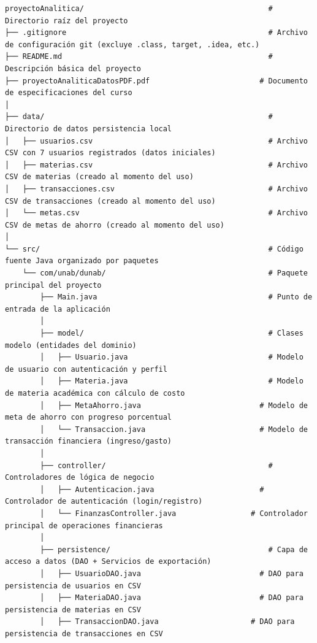 \documentclass[utf8]{article}
\begin{document}
\begin{verbatim}
proyectoAnalitica/                                          # Directorio raíz del proyecto
├── .gitignore                                              # Archivo de configuración git (excluye .class, target, .idea, etc.)
├── README.md                                               # Descripción básica del proyecto
├── proyectoAnaliticaDatosPDF.pdf                         # Documento de especificaciones del curso
│
├── data/                                                   # Directorio de datos persistencia local
│   ├── usuarios.csv                                        # Archivo CSV con 7 usuarios registrados (datos iniciales)
│   ├── materias.csv                                        # Archivo CSV de materias (creado al momento del uso)
│   ├── transacciones.csv                                   # Archivo CSV de transacciones (creado al momento del uso)
│   └── metas.csv                                           # Archivo CSV de metas de ahorro (creado al momento del uso)
│
└── src/                                                    # Código fuente Java organizado por paquetes
    └── com/unab/dunab/                                     # Paquete principal del proyecto
        ├── Main.java                                       # Punto de entrada de la aplicación
        │
        ├── model/                                          # Clases modelo (entidades del dominio)
        │   ├── Usuario.java                                # Modelo de usuario con autenticación y perfil
        │   ├── Materia.java                                # Modelo de materia académica con cálculo de costo
        │   ├── MetaAhorro.java                           # Modelo de meta de ahorro con progreso porcentual
        │   └── Transaccion.java                          # Modelo de transacción financiera (ingreso/gasto)
        │
        ├── controller/                                     # Controladores de lógica de negocio
        │   ├── Autenticacion.java                        # Controlador de autenticación (login/registro)
        │   └── FinanzasController.java                 # Controlador principal de operaciones financieras
        │
        ├── persistence/                                    # Capa de acceso a datos (DAO + Servicios de exportación)
        │   ├── UsuarioDAO.java                           # DAO para persistencia de usuarios en CSV
        │   ├── MateriaDAO.java                           # DAO para persistencia de materias en CSV
        │   ├── TransaccionDAO.java                     # DAO para persistencia de transacciones en CSV

\end{verbatim}
\end{document}
